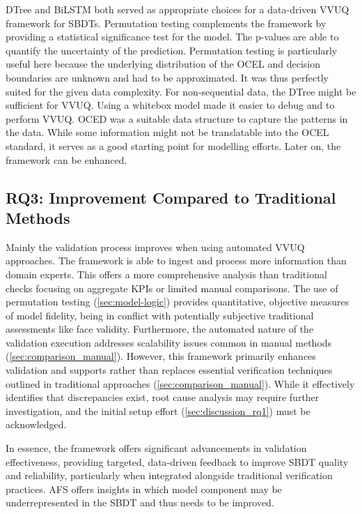 DTree and BiLSTM both served as appropriate choices for a data-driven VVUQ framework for SBDTs. Permutation testing complements the framework by providing a statistical significance test for the model. The p-values are able to quantify the uncertainty of the prediction. Permutation testing is particularly useful here because the underlying distribution of the OCEL and decision boundaries are unknown and had to be approximated. It was thus perfectly suited for the given data complexity. For non-sequential data, the DTree might be sufficient for VVUQ. Using a whitebox model made it easier to debug and to perform VVUQ. OCED was a suitable data structure to capture the patterns in the data. While some information might not be translatable into the OCEL standard, it serves as a good starting point for modelling efforts. Later on, the framework can be enhanced.

\subsection{RQ3: Improvement Compared to Traditional Methods}
\label{sec:discussion_rq3}

Mainly the validation process improves when using automated VVUQ approaches. The framework is able to ingest and process more information than domain experts. This offers a more comprehensive analysis than traditional checks focusing on aggregate KPIs or limited manual comparisons. The use of permutation testing (\autoref{sec:model-logic}) provides quantitative, objective measures of model fidelity, being in conflict with potentially subjective traditional assessments like face validity. Furthermore, the automated nature of the validation execution addresses scalability issues common in manual methods (\autoref{sec:comparison_manual}). However, this framework primarily enhances validation and supports rather than replaces essential verification techniques outlined in traditional approaches (\autoref{sec:comparison_manual}). While it effectively identifies that discrepancies exist, root cause analysis may require further investigation, and the initial setup effort (\autoref{sec:discussion_rq1}) must be acknowledged.

In essence, the framework offers significant advancements in validation effectiveness, providing targeted, data-driven feedback to improve SBDT quality and reliability, particularly when integrated alongside traditional verification practices. AFS offers insights in which model component may be underrepresented in the SBDT and thus needs to be improved.

